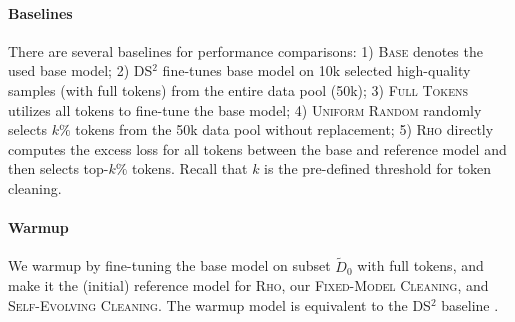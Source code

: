 \paragraph{Baselines} There are several baselines for performance comparisons: 1) \textsc{Base} denotes the used base model; 2) \textsc{DS$^2$} \cite{pang2024improving} fine-tunes base model on 10k selected high-quality samples (with full tokens) from the entire data pool (50k); 3) \textsc{Full Tokens} utilizes all tokens to fine-tune the base model; 4) \textsc{Uniform Random} randomly selects $k\%$ tokens from the 50k data pool without replacement; 5) \textsc{Rho} \citep{mindermann2022prioritized, linnot} directly computes the excess loss for all tokens between the base and reference model and then selects top-$k\%$ tokens. Recall that $k$ is the pre-defined threshold for token cleaning.

\paragraph{Warmup} We warmup by fine-tuning the base model on subset $\widetilde{D}_0$ with full tokens, and make it the (initial) reference model for \textsc{Rho}, our \textsc{Fixed-Model Cleaning}, and \textsc{Self-Evolving Cleaning}. The warmup model is equivalent to the DS$^2$ baseline \citep{pang2024improving}.

\begin{table*}[ht]
\centering
\caption{Performance results of self-evolving cleaning strategy over iterations (checkpoints) on seven benchmarks. Base model: \texttt{LLaMA-3.2-3B}. These performance results align with three observations arising from the Matthew effect.}
\vspace{1ex}
\label{tab:iteration_results_llama3b}
\end{table*}

